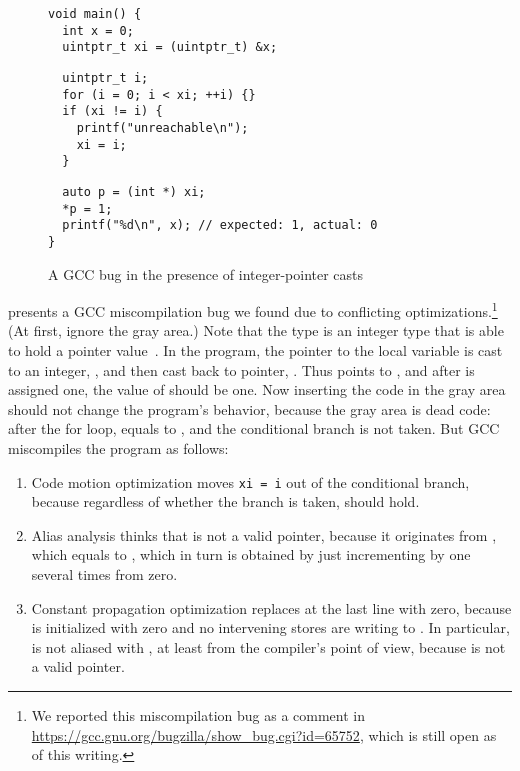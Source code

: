 \begin{figure}[t]
\begin{center}
\small
\begin{minipage}{0.5\textwidth}
\begin{verbatim}
void main() { 
  int x = 0;
  uintptr_t xi = (uintptr_t) &x;
\end{verbatim}
\vskip -0.7cm
\begin{verbatim}
  uintptr_t i;
  for (i = 0; i < xi; ++i) {}
  if (xi != i) {
    printf("unreachable\n");
    xi = i;
  }
\end{verbatim}
\vskip -0.7cm
\begin{verbatim}
  auto p = (int *) xi;
  *p = 1;
  printf("%d\n", x); // expected: 1, actual: 0
}
\end{verbatim}
\end{minipage}
\end{center}
\caption{A GCC bug in the presence of integer-pointer casts}
\label{fig:introduction:bug}
\end{figure}

 presents a GCC miscompilation bug we found due to conflicting
optimizations.\footnote{We reported this miscompilation bug as a comment in
  \url{https://gcc.gnu.org/bugzilla/show_bug.cgi?id=65752}, which is still open as of this writing.}
(At first, ignore the gray area.)  Note that the type  is an integer type that is
able to hold a pointer value~\cite[\S7.20.1.4]{c18}.  In the program, the pointer to the local
variable  is cast to an integer, , and then cast back to pointer, .  Thus
 points to , and after  is assigned one, the value of  should be
one.  Now inserting the code in the gray area should not change the program's behavior, because the
gray area is dead code: after the for loop,  equals to , and the conditional branch
is not taken.  But GCC miscompiles the program as follows:
%
\begin{enumerate}
\item Code motion optimization moves \texttt{xi = i} out of the conditional branch, because
  regardless of whether the branch is taken,  should hold.
\item Alias analysis thinks that  is not a valid pointer, because it originates from
  , which equals to , which in turn is obtained by just incrementing by one several
  times from zero.
\item Constant propagation optimization replaces  at the last line with zero, because
   is initialized with zero and no intervening stores are writing to .  In
  particular,  is not aliased with , at least from the compiler's point of view,
  because  is not a valid pointer.
\end{enumerate}

